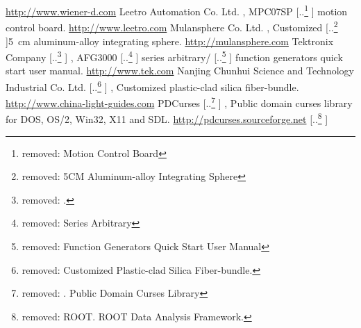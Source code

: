\documentclass{nst}
\providecommand{\DIFadd}[1]{{\protect\color{blue} \sf #1}} %
\providecommand{\DIFdel}[1]{{\protect\color{red} [..\footnote{removed: #1} ]}} %
\providecommand{\DIFaddbegin}{} %
\providecommand{\DIFaddend}{} %
\providecommand{\DIFdelbegin}{} %
\providecommand{\DIFdelend}{} %
\begin{document}
\begin{thebibliography}{99}
\DIFdelend \DIFaddbegin \href{http://www.wiener-d.com/sc/modules/camac--modules/cc-usb.html}{http://www.wiener-d.com}
	\DIFaddend {} {Leetro Automation Co. Ltd.}\DIFaddbegin \DIFadd{, }\DIFaddend {MPC07SP \DIFdelbegin \DIFdel{Motion Control Board}\DIFdelend \DIFaddbegin \DIFadd{motion control board}\DIFaddend }. \DIFdelbegin %
\DIFdelend \DIFaddbegin \href{http://www.leetro.com/english/}{http://www.leetro.com}
	\DIFaddend {} {Mulansphere Co. Ltd.}\DIFaddbegin \DIFadd{, }\DIFaddend {Customized \DIFdelbegin \DIFdel{5CM Aluminum-alloy Integrating Sphere}\DIFdelend \DIFaddbegin \SI{5}{cm} \DIFadd{aluminum-alloy integrating sphere}\DIFaddend }. \DIFdelbegin %
\DIFdelend \DIFaddbegin \href{http://mulansphere.com/e-index.html/}{http://mulansphere.com}
	\DIFaddend {} {Tektronix Company}\DIFdelbegin \DIFdel{. }\DIFdelend \DIFaddbegin \DIFadd{, }\DIFaddend {AFG3000 \DIFdelbegin \DIFdel{Series Arbitrary}\DIFdelend \DIFaddbegin \DIFadd{series arbitrary}\DIFaddend /\DIFdelbegin \DIFdel{Function Generators Quick Start User Manual}\DIFdelend \DIFaddbegin \DIFadd{function generators quick start user manual}\DIFaddend }. \DIFdelbegin %
\DIFdelend \DIFaddbegin \href{http://www.tek.com/signal-generator/afg3000-function-generator/}{http://www.tek.com}
	\DIFaddend {} Nanjing Chunhui Science and Technology Industrial Co. Ltd.\DIFdelbegin \DIFdel{Customized Plastic-clad Silica Fiber-bundle.  }%
\DIFdelend \DIFaddbegin \DIFadd{, Customized plastic-clad silica fiber-bundle.  }\href{http://www.china-light-guides.com/}{http://www.china-light-guides.com}
	\DIFaddend {} PDCurses\DIFdelbegin \DIFdel{.  Public Domain Curses Library }\DIFdelend \DIFaddbegin \DIFadd{,  Public domain curses library }\DIFaddend for DOS, OS/2, Win32, X11 and SDL. \DIFdelbegin %
\DIFdelend \DIFaddbegin \href{http://pdcurses.sourceforge.net/}{http://pdcurses.sourceforge.net}
	\DIFaddend {} \DIFdelbegin \DIFdel{ROOT.  ROOT Data Analysis Framework. }%

\end{thebibliography}
\end{document}
